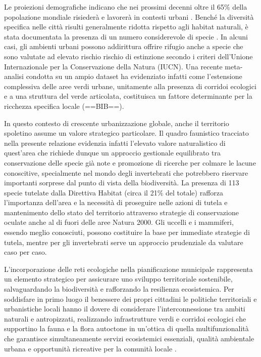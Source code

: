 \documentclass[
]{book}
\begin{document}
Le proiezioni demografiche indicano che nei prossimi decenni oltre il 65\% della popolazione mondiale risiederà e lavorerà in contesti urbani \citep{owid-population-growth}. Benché la diversità specifica nelle città risulti generalmente ridotta rispetto agli habitat naturali, è stata documentata la presenza di un numero considerevole di specie \citep{heinoUnravellingCorrelatesSpecies2017, weisserAnimalaidedDesignPlanning2025, fairbairnUrbanBiodiversityAffected2024, visintinDesigningCitiesEveryday2025, mendezBetterNotMore2024}. In alcuni casi, gli ambienti urbani possono addirittura offrire rifugio anche a specie che sono valutate ad elevato rischio rischio di estinzione secondo i criteri dell'Unione Internazionale per la Conservazione della Natura (IUCN). Una recente meta-analisi condotta su un ampio dataset ha evidenziato infatti come l'estensione complessiva delle aree verdi urbane, unitamente alla presenza di corridoi ecologici e a una struttura del verde articolata, costituisca un fattore determinante per la ricchezza specifica locale (==BIB==).

In questo contesto di crescente urbanizzazione globale, anche il territorio spoletino assume un valore strategico particolare. Il quadro faunistico tracciato nella presente relazione evidenzia infatti l'elevato valore naturalistico di quest'area che richiede dunque un approccio gestionale equilibrato tra conservazione delle specie già note e promozione di ricerche per colmare le lacune conoscitive, specialmente nel mondo degli invertebrati che potrebbero riservare importanti sorprese dal punto di vista della biodiversità. La presenza di 113 specie tutelate dalla Direttiva Habitat (circa il 21\% del totale) rafforza l'importanza dell'area e la necessità di proseguire nelle azioni di tutela e mantenimento dello stato del territorio attraverso strategie di conservazione oculate anche al di fuori delle aree Natura 2000. Gli uccelli e i mammiferi, essendo meglio conosciuti, possono costituire la base per immediate strategie di tutela, mentre per gli invertebrati serve un approccio prudenziale da valutare caso per caso.

L'incorporazione delle reti ecologiche nella pianificazione municipale rappresenta un elemento strategico per assicurare uno sviluppo territoriale sostenibile, salvaguardando la biodiversità e rafforzando la resilienza ecosistemica. Per soddisfare in primo luogo il benessere dei propri cittadini le politiche territoriali e urbanistiche locali hanno il dovere di considerare l'interconnessione tra ambiti naturali e antropizzati, realizzando infrastrutture verdi e corridoi ecologici che supportino la fauna e la flora autoctone in un'ottica di quella multifunzionalità che garantisce simultaneamente servizi ecosistemici essenziali, qualità ambientale urbana e opportunità ricreative per la comunità locale \citep{fairbairnUrbanBiodiversityAffected2024}.
\end{document}
